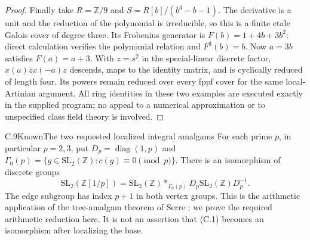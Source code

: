 \begin{proof}
Finally take $R=\mathbb Z/9$ and
$S=R[b]/(b^3-b-1)$. The derivative is a unit and the reduction
of the polynomial is irreducible, so this is a finite etale
Galois cover of degree three. Its Frobenius generator is
$F(b)=1+4b+3b^2$; direct calculation verifies the polynomial
relation and $F^3(b)=b$. Now $a=3b$ satisfies $F(a)=a+3$.
With $z=s^2$ in the special-linear discrete factor,
$x(a)z x(-a)z$ descends, maps to the identity matrix, and is
cyclically reduced of length four. Its powers remain reduced
over every fppf cover for the same local-Artinian argument.
All ring identities in these two examples are executed exactly
in the supplied program; no appeal to a numerical approximation
or to unspecified class field theory is involved.
\end{proof}

\begin{statement}{C.9}{Known}{The two requested localized integral amalgams}
For each prime $p$, in particular $p=2,3$, put
$D_p=\operatorname{diag}(1,p)$ and
$\Gamma_0(p)=\{g\in\mathrm{SL}_2(\mathbb Z):c(g)\equiv0\pmod p\}$.
There is an isomorphism of discrete groups
\[
 \mathrm{SL}_2(\mathbb Z[1/p])=
 \mathrm{SL}_2(\mathbb Z)*_{\Gamma_0(p)}
 D_p\mathrm{SL}_2(\mathbb Z)D_p^{-1}.                              \tag{C.11}
\]
The edge subgroup has index $p+1$ in both vertex groups.
This is the arithmetic application of the tree-amalgam theorem
of Serre \cite[\S1.2]{Serre1969C}; we prove the required arithmetic
reduction here. It is not an assertion that (C.1) becomes an
isomorphism after localizing the base.
\end{statement}
